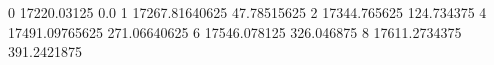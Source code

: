 0 17220.03125 0.0
1 17267.81640625 47.78515625
2 17344.765625 124.734375
4 17491.09765625 271.06640625
6 17546.078125 326.046875
8 17611.2734375 391.2421875

